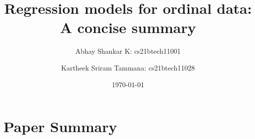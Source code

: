 \documentclass{amsart}
\begin{document}
    \title{Regression models for ordinal data: A concise summary}
    \author{Abhay Shankar K: cs21btech11001}
    \author{Kartheek Sriram Tammana: cs21btech11028}
    \date{\today}
    
    
    \maketitle

    \section{Paper Summary}
\end{document}
